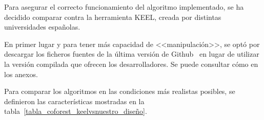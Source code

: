 Para asegurar el correcto funcionamiento del algoritmo implementado, se ha decidido comparar contra la herramienta KEEL, creada por distintas universidades españolas.

En primer lugar y para tener más capacidad de <<manipulación>>, se optó por descargar los ficheros fuentes de la última versión de Github~\cite{keelRepo} en lugar de utilizar la versión compilada que ofrecen los desarrolladores. Se puede consultar cómo en los anexos.

Para comparar los algoritmos en las condiciones más realistas posibles, se definieron las características mostradas en la tabla~\ref{tabla_coforest_keelvsnuestro_diseño}.

\begin{table}
	\caption[\textit{Co-forest}: resumen del experimento contra KEEL]{Tabla resumen con el diseño del experimento realizado para comparar la implementación propia contra KEEL.}
	\label{tabla_coforest_keelvsnuestro_diseño}	
\end{table}


